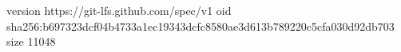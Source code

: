 version https://git-lfs.github.com/spec/v1
oid sha256:b697323dcf04b4733a1ec19343dcfc8580ae3d613b789220c5cfa030d92db703
size 11048
